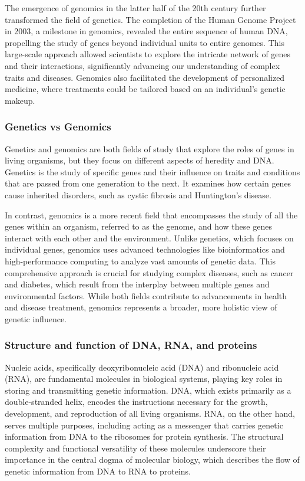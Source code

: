 The emergence of genomics in the latter half of the 20th century further transformed the field of genetics. The completion of the Human Genome Project in 2003, a milestone in genomics, revealed the entire sequence of human DNA, propelling the study of genes beyond individual units to entire genomes. This large-scale approach allowed scientists to explore the intricate network of genes and their interactions, significantly advancing our understanding of complex traits and diseases. Genomics also facilitated the development of personalized medicine, where treatments could be tailored based on an individual's genetic makeup. \cite{Gayon2016}


\subsubsection{\textbf{Genetics vs Genomics}}

Genetics and genomics are both fields of study that explore the roles of genes in living organisms, but they focus on different aspects of heredity and DNA. Genetics is the study of specific genes and their influence on traits and conditions that are passed from one generation to the next. It examines how certain genes cause inherited disorders, such as cystic fibrosis and Huntington's disease. %

In contrast, genomics is a more recent field that encompasses the study of all the genes within an organism, referred to as the genome, and how these genes interact with each other and the environment. Unlike genetics, which focuses on individual genes, genomics uses advanced technologies like bioinformatics and high-performance computing to analyze vast amounts of genetic data. This comprehensive approach is crucial for studying complex diseases, such as cancer and diabetes, which result from the interplay between multiple genes and environmental factors. While both fields contribute to advancements in health and disease treatment, genomics represents a broader, more holistic view of genetic influence. %

\subsubsection{\textbf{Structure and function of DNA, RNA, and proteins}}

Nucleic acids, specifically deoxyribonucleic acid (DNA) and ribonucleic acid (RNA), are fundamental molecules in biological systems, playing key roles in storing and transmitting genetic information. DNA, which exists primarily as a double-stranded helix, encodes the instructions necessary for the growth, development, and reproduction of all living organisms. RNA, on the other hand, serves multiple purposes, including acting as a messenger that carries genetic information from DNA to the ribosomes for protein synthesis. The structural complexity and functional versatility of these molecules underscore their importance in the central dogma of molecular biology, which describes the flow of genetic information from DNA to RNA to proteins. %

